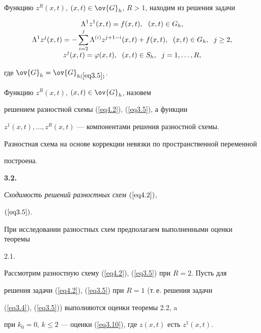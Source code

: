 Функцию $z^R(x,t)$, $(x,t)\in\ov{G}_h$, $R> 1$, находим из решения задачи


\begin{equation}


\label{eq4.2}


\begin{array}{c}


\displaystyle\Lambda^1 z^1(x,t)=f(x,t),\ \ (x,t)\in G_h,\\


\displaystyle \Lambda^1 z^j(x,t)=-\sum_{i=2}^j\Lambda^{(i)}


z^{j+1-i}(x,t)+f(x,t),


\ \; (x,t)\in G_h,\ \; j\ge 2,\\


\displaystyle z^j(x,t)=\f(x,t),\ \; (x,t)\in S_h,\ \; j=1,\dotsc,R,


\end{array}


\end{equation}


где $\ov{G}_h=\ov{G}_{h(\ref{eq3.5})}$.


Функцию $z^R(x,t)$, $(x,t)\in\ov{G}_h$, назовем


решением разностной схемы (\ref{eq4.2}), (\ref{eq3.5}), а функции


$z^1(x,t),\dotsc,z^R(x,t)$ --- компонентами решения разностной схемы.


Разностная схема на основе коррекции невязки по пространственной переменной


построена.





\medskip


{\bf 3.2.} {\it Сходимость решений разностных схем $(\ref{eq4.2})$,


$(\ref{eq3.5})$.}


При исследовании разностных схем предполагаем выполненными оценки теоремы


2.1.





Рассмотрим разностную схему (\ref{eq4.2}), (\ref{eq3.5}) при $R=2$. Пусть для


решения задачи (\ref{eq4.2}), (\ref{eq3.5}) при $R=1$ (т.\,е. решения задачи


(\ref{eq3.4}), (\ref{eq3.5})) выполняются оценки теоремы 2.2, a


при $k_0=0$, $k\le 2$ --- оценки (\ref{eq3.10}), где $z(x,t)$ есть $z^1(x,t)$.





